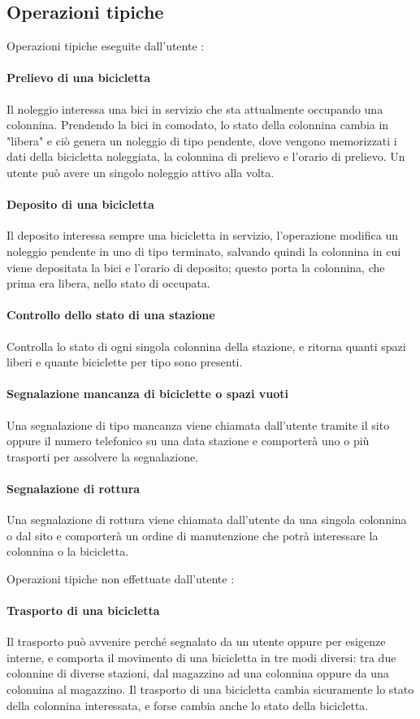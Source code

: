 \documentclass[a4paper,twoside]{article}
\begin{document}
\subsection{Operazioni tipiche}
Operazioni tipiche eseguite dall'utente :
\paragraph{Prelievo di una bicicletta} Il noleggio interessa una bici in servizio che sta attualmente occupando una colonnina. Prendendo la bici in comodato, lo stato della colonnina cambia in "libera" e ciò genera un noleggio di tipo pendente, dove vengono memorizzati i dati della bicicletta noleggiata, la colonnina di prelievo e l'orario di prelievo. Un utente può avere un singolo noleggio attivo alla volta.
\paragraph{Deposito di una bicicletta} Il deposito interessa sempre una bicicletta in servizio, l'operazione modifica un noleggio pendente in uno di tipo terminato, salvando quindi la colonnina in cui viene depositata la bici e l'orario di deposito; questo porta la colonnina, che prima era libera, nello stato di occupata.
\paragraph{Controllo dello stato di una stazione} Controlla lo stato di ogni singola colonnina della stazione, e ritorna quanti spazi liberi e quante biciclette per tipo sono presenti.
\paragraph{Segnalazione mancanza di biciclette o spazi vuoti} Una segnalazione di tipo mancanza viene chiamata dall'utente tramite il sito oppure il numero telefonico su una data stazione e comporterà uno o più trasporti per assolvere la segnalazione.
\paragraph{Segnalazione di rottura} Una segnalazione di rottura viene chiamata dall'utente da una singola colonnina o dal sito e comporterà un ordine di manutenzione che potrà interessare la colonnina o la bicicletta.
\par Operazioni tipiche non effettuate dall'utente :
\paragraph{Trasporto di una bicicletta} Il trasporto può avvenire perché segnalato da un utente oppure per esigenze interne, e comporta il movimento di una bicicletta in tre modi diversi: tra due colonnine di diverse stazioni, dal magazzino ad una colonnina oppure da una colonnina al magazzino. Il trasporto di una bicicletta cambia sicuramente lo stato della colonnina interessata, e forse cambia anche lo stato della bicicletta.
\end{document}
